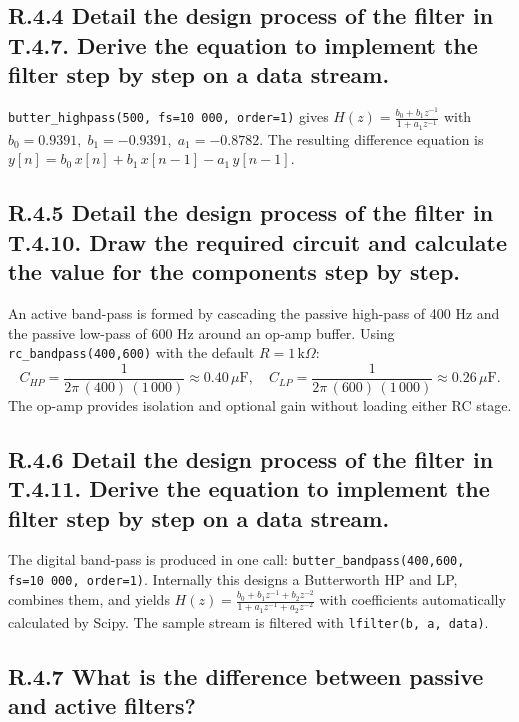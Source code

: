 \documentclass{article}
\begin{document}
\subsection*{R.4.4 Detail the design process of the filter in T.4.7. Derive the equation to implement the filter step by step on a data stream.}

\texttt{butter\_highpass(500, fs=10\,000, order=1)} gives  
\( H(z)=\frac{b_0+b_1z^{-1}}{1+a_1z^{-1}} \) with  
\( b_0= 0.9391,\; b_1=-0.9391,\; a_1=-0.8782. \)  
The resulting difference equation is  
\( y[n]=b_0\,x[n]+b_1\,x[n-1]-a_1\,y[n-1]. \)

\subsection*{R.4.5 Detail the design process of the filter in T.4.10. Draw the required circuit and calculate the value for the components step by step.}

An active band-pass is formed by cascading the passive high-pass of 400 Hz and the passive low-pass of 600 Hz around an op-amp buffer.  
Using \texttt{rc\_bandpass(400,600)} with the default $R=1\,\mathrm{k}\Omega$:
\[
C_{HP}=\frac{1}{2\pi\,(400)\,(1\,000)}\approx 0.40\,\mu\mathrm{F},\quad
C_{LP}=\frac{1}{2\pi\,(600)\,(1\,000)}\approx 0.26\,\mu\mathrm{F}.
\]
The op-amp provides isolation and optional gain without loading either RC stage.

\subsection*{R.4.6 Detail the design process of the filter in T.4.11. Derive the equation to implement the filter step by step on a data stream.}

The digital band-pass is produced in one call:
\texttt{butter\_bandpass(400,600, fs=10\,000, order=1)}.  
Internally this designs a Butterworth HP and LP, combines them, and yields
\( H(z)=\frac{b_0+b_1z^{-1}+b_2z^{-2}}{1+a_1z^{-1}+a_2z^{-2}} \)  
with coefficients automatically calculated by Scipy.  
The sample stream is filtered with \texttt{lfilter(b, a, data)}.

\subsection*{R.4.7 What is the difference between passive and active filters?}
\end{document}
